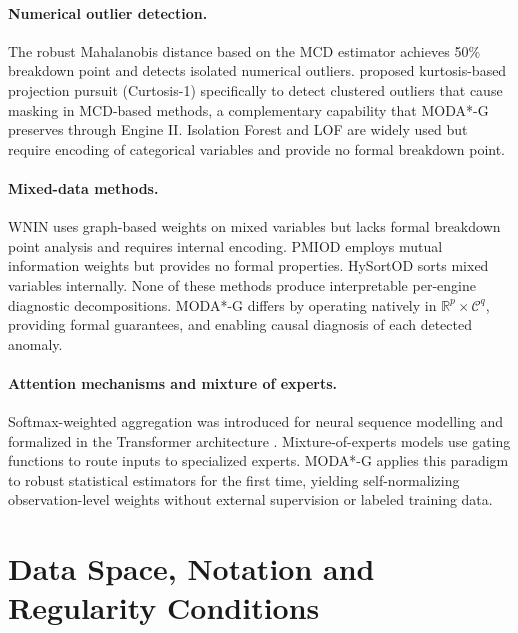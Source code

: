 \documentclass[11pt]{article}
\theoremstyle{plain}
\theoremstyle{definition}
\newcommand{\R}{\mathbb{R}}
\newcommand{\C}{\mathcal{C}}
\begin{document}
\paragraph{Numerical outlier detection.}
The robust Mahalanobis distance based on the MCD estimator
\citep{rousseeuw1985, rousseeuw1999} achieves 50\%
breakdown point and detects isolated numerical outliers.
\citet{pena2001} proposed kurtosis-based projection pursuit
(Curtosis-1) specifically to detect clustered outliers that
cause masking in MCD-based methods, a complementary
capability that MODA*-G preserves through Engine II.
Isolation Forest \citep{liu2008} and LOF \citep{breunig2000}
are widely used but require encoding of categorical
variables and provide no formal breakdown point.

\paragraph{Mixed-data methods.}
WNIN \citep{wang2021} uses graph-based weights on mixed
variables but lacks formal breakdown point analysis and
requires internal encoding. PMIOD \citep{yuan2023} employs
mutual information weights but provides no formal
properties. HySortOD \citep{cabral2025} sorts mixed
variables internally. None of these methods produce
interpretable per-engine diagnostic decompositions.
MODA*-G differs by operating natively in $\R^p \times \C^q$,
providing formal guarantees, and enabling causal diagnosis
of each detected anomaly.

\paragraph{Attention mechanisms and mixture of experts.}
Softmax-weighted aggregation was introduced for neural
sequence modelling \citep{bahdanau2015} and formalized
in the Transformer architecture \citep{vaswani2017}.
Mixture-of-experts models \citep{jordan1994} use gating
functions to route inputs to specialized experts.
MODA*-G applies this paradigm to robust statistical
estimators for the first time, yielding self-normalizing
observation-level weights without external supervision
or labeled training data.

\section{Data Space, Notation and Regularity Conditions}
\label{sec:setup}
\end{document}
